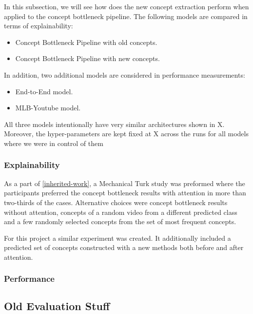 In this subsection, we will see how does the new concept extraction perform when applied to the concept bottleneck pipeline.
The following models are compared in terms of explainability:
\begin{itemize}
    \item Concept Bottleneck Pipeline with old concepts.
    \item Concept Bottleneck Pipeline with new concepts.
\end{itemize}
In addition, two additional models are considered in performance measurements:
\begin{itemize}
    \item End-to-End model.
    \item MLB-Youtube model. 
\end{itemize}

All three models intentionally have very similar architectures shown in X.
Moreover, the hyper-parameters are kept fixed at X across the runs for all models where we were in control of them


\subsubsection{Explainability}

As a part of \ref{inherited-work}, a Mechanical Turk study was preformed where the participants preferred the concept bottleneck results with attention in more than two-thirds of the cases.
Alternative choices were concept bottleneck results without attention, concepts of a random video from a different predicted class and a few randomly selected concepts from the set of most frequent concepts.


For this project a similar experiment was created. 
It additionally included a predicted set of concepts constructed with a new methods both before and after attention.

\subsubsection{Performance}


\subsection{Old Evaluation Stuff}

